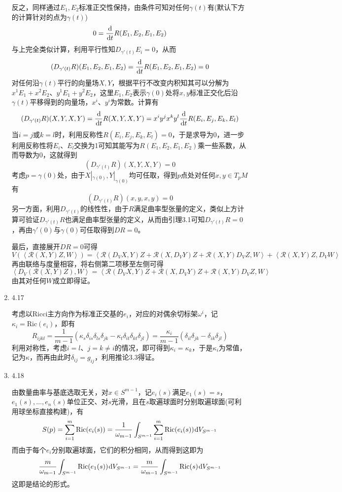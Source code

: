\documentclass[a4paper,UTF8,fontset=windows,10pt]{ctexart}
\newcommand*{\rc}{\mathcal{R}}
\newcommand*{\dr}{\hspace{0.07em}\mathrm{d}}
\begin{document}
\begin{enumerate}
    反之，同样通过$E_1,E_2$标准正交性保持，由条件可知对任何$\gamma(t)$有(默认下方的计算针对的点为$\gamma(t)$)
    $$0=\frac{\dr}{\dr t}R(E_1,E_2,E_1,E_2)$$
    与上完全类似计算，利用平行性知$D_{\gamma'(t)}E_i=0$，从而
    $$(D_{\gamma'(t)}R)(E_1,E_2,E_1,E_2)=\frac{\dr}{\dr t}R(E_1,E_2,E_1,E_2)=0$$
    对任何沿$\gamma(t)$平行的向量场$X,Y$，根据平行不改变内积知其可以分解为$x^1E_1+x^2E_2$、$y^1E_1+y^2E_2$，这里$E_1,E_2$表示$\gamma(0)$处将$x,y$标准正交化后沿$\gamma(t)$平移得到的向量场，$x^i$、$y^i$为常数。计算有
    $$(D_{\gamma'(t)}R)(X,Y,X,Y)=\frac{\dr}{\dr t}R(X,Y,X,Y)=x^iy^jx^ky^l\frac{\dr}{\dr t}R(E_i,E_j,E_k,E_l)$$
    当$i=j$或$k=l$时，利用反称性$R(E_i,E_j,E_k,E_l)=0$，于是求导为0，进一步利用反称性将$E_i$、$E_l$交换为1可知其能写为$R(E_1,E_2,E_1,E_2)$乘一些系数，从而导数为0，这就得到
    $$(D_{\gamma'(t)}R)(X,Y,X,Y)=0$$
    考虑$p=\gamma(0)$处，由于$X|_{\gamma(0)},Y|_{\gamma(0)}$均可任取，得到$p$点处对任何$x,y\in T_pM$有
    $$(D_{\gamma'(t)}R)(x,y,x,y)=0$$
    另一方面，利用$D_{\gamma'(t)}$的线性性，由于$R$满足曲率型张量的定义，类似上方计算可验证$D_{\gamma'(t)}R$也满足曲率型张量的定义，从而由引理3.1可知$D_{\gamma'(t)}R=0$，再由$\gamma'(0)$与$\gamma(0)$可任取得到$DR=0$。
    
    最后，直接展开$DR=0$可得
    $$V(\left<\rc(X,Y)Z,W\right>)=\left<\rc(D_VX,Y)Z+\rc(X,D_VY)Z+\rc(X,Y)D_VZ,W\right>+\left<\rc(X,Y)Z,D_VW\right>$$
    再由联络与度量相容，将右侧第二项移至左侧可得
    $$\left<D_V(\rc(X,Y)Z),W\right>=\left<\rc(D_VX,Y)Z+\rc(X,D_VY)Z+\rc(X,Y)D_VZ,W\right>$$
    由其对任何$W$成立即得证。
    
    \item 4.17
    
    考虑以Ricci主方向作为标准正交基的$e_i$，对应的对偶余切标架$\omega^i$，记$\kappa_i=\mathrm{Ric}(e_i)$，即有
    $$R_{ijkl}=\frac{1}{m-1}(\kappa_s\delta_{is}\delta_{ls}\delta_{jk}-\kappa_t\delta_{it}\delta_{kt}\delta_{jl})=\frac{\kappa_i}{m-1}(\delta_{il}\delta_{jk}-\delta_{ik}\delta_{jl})$$
    利用对称性，考虑$i=l$、$j=k\ne i$的情况，即可得到$\kappa_i=\kappa_k$，于是$\kappa_i$为常值，记为$\kappa$，而再由此时$\delta_{ij}=g_{ij}$，利用推论3.3得证。
    
    \item 4.18
    
    由数量曲率与基底选取无关，对$x\in S^{m-1}$，记$e_i(s)$满足$e_1(s)=s$，$e_1(s),\dots,e_n(s)$单位正交、对$s$光滑，且在$s$取遍球面时分别取遍球面(可利用球坐标直接构建)，有
    $$S(p)=\sum_{i=1}^m\mathrm{Ric}(e_i(s))=\frac{1}{\omega_{m-1}}\int_{S^{m-1}}\sum_{i=1}^m\mathrm{Ric}(e_i(s))\dr V_{S^{m-1}}$$
    而由于每个$e_i$分别取遍球面，它们的积分相同，从而得到这即为
    $$\frac{m}{\omega_{m-1}}\int_{S^{m-1}}\mathrm{Ric}(e_1(s))\dr V_{S^{m-1}}=\frac{m}{\omega_{m-1}}\int_{S^{m-1}}\mathrm{Ric}(s)\dr V_{S^{m-1}}$$
    这即是结论的形式。
    

\end{enumerate}
\end{document}
